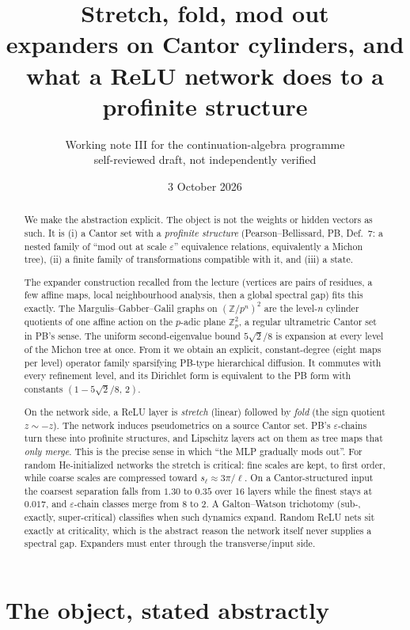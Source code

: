 \documentclass[11pt]{article}
\title{Stretch, fold, mod out\\[4pt]
\large expanders on Cantor cylinders, and what a ReLU network does to a profinite structure}
\author{Working note III for the continuation-algebra programme\\
\small self-reviewed draft, not independently verified}
\date{3 October 2026}
\theoremstyle{definition}
\theoremstyle{remark}
\newcommand{\Z}{\mathbb Z}
\begin{document}
\maketitle

\begin{abstract}
We make the abstraction explicit. The object is not the weights or hidden vectors as such. It is (i) a Cantor set with a \emph{profinite structure} (Pearson--Bellissard, PB, Def.~7: a nested family of ``mod out at scale $\varepsilon$'' equivalence relations, equivalently a Michon tree), (ii) a finite family of transformations compatible with it, and (iii) a state.

The expander construction recalled from the lecture (vertices are pairs of residues, a few affine maps, local neighbourhood analysis, then a global spectral gap) fits this exactly. The Margulis--Gabber--Galil graphs on $(\Z/p^n)^2$ are the level-$n$ cylinder quotients of one affine action on the $p$-adic plane $\Z_p^2$, a regular ultrametric Cantor set in PB's sense. The uniform second-eigenvalue bound $5\sqrt2/8$ is expansion at every level of the Michon tree at once. From it we obtain an explicit, constant-degree (eight maps per level) operator family sparsifying PB-type hierarchical diffusion. It commutes with every refinement level, and its Dirichlet form is equivalent to the PB form with constants $(1-5\sqrt2/8,\,2)$.

On the network side, a ReLU layer is \emph{stretch} (linear) followed by \emph{fold} (the sign quotient $z\sim-z$). The network induces pseudometrics on a source Cantor set. PB's $\varepsilon$-chains turn these into profinite structures, and Lipschitz layers act on them as tree maps that \emph{only merge}. This is the precise sense in which ``the MLP gradually mods out''. For random He-initialized networks the stretch is critical: fine scales are kept, to first order, while coarse scales are compressed toward $s_\ell\approx3\pi/\ell$. On a Cantor-structured input the coarsest separation falls from $1.30$ to $0.35$ over 16 layers while the finest stays at $0.017$, and $\varepsilon$-chain classes merge from 8 to 2. A Galton--Watson trichotomy (sub-, exactly, super-critical) classifies when such dynamics expand. Random ReLU nets sit exactly at criticality, which is the abstract reason the network itself never supplies a spectral gap. Expanders must enter through the transverse/input side.
\end{abstract}

\section{The object, stated abstractly}
\end{document}
